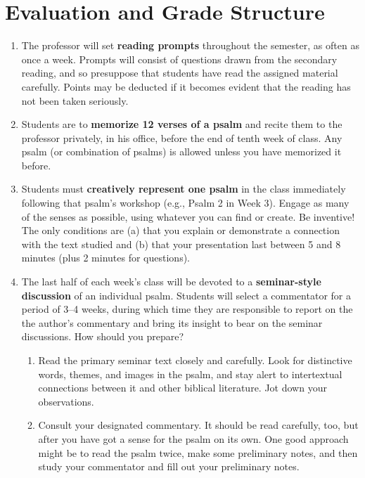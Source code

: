 \documentclass[titlepage]{article}
\begin{document}
\section{Evaluation and Grade Structure}
\label{evaluation}

\begin{enumerate}

	\item The professor will set \textbf{reading prompts} throughout the
	semester, as often as once a week. Prompts will consist of questions
	drawn from the secondary reading, and so presuppose that students
	have read the assigned material carefully. Points may be deducted if
	it becomes evident that the reading has not been taken seriously.

	\item Students are to \textbf{memorize 12 verses of a psalm} and
	recite them to the professor privately, in his office, before the
	end of tenth week of class. Any psalm (or combination of psalms) is
	allowed unless you have memorized it before.

	\item Students must \textbf{creatively represent one psalm} in the
	class immediately following that psalm’s workshop (e.g., Psalm 2 in
	Week 3). Engage as many of the senses as possible, using whatever
	you can find or create. Be inventive! The only conditions are (a)
	that you explain or demonstrate a connection with the text studied
	and (b) that your presentation last between 5 and 8 minutes (plus 2
	minutes for questions).

	\item The last half of each week's class will be devoted to a
	\textbf{seminar-style discussion} of an individual psalm. Students
	will select a commentator for a period of 3--4 weeks, during which
	time they are responsible to report on the the author's commentary
	and bring its insight to bear on the seminar discussions. How should
	you prepare?

	\begin{enumerate}

		\item Read the primary seminar text closely and carefully. Look
		for distinctive words, themes, and images in the psalm, and stay
		alert to intertextual connections between it and other biblical
		literature. Jot down your observations.

		\item Consult your designated commentary. It should be read
		carefully, too, but after you have got a sense for the psalm on
		its own. One good approach might be to read the psalm twice,
		make some preliminary notes, and then study your commentator and
		fill out your preliminary notes.


\end{enumerate}
\end{enumerate}
\end{document}
